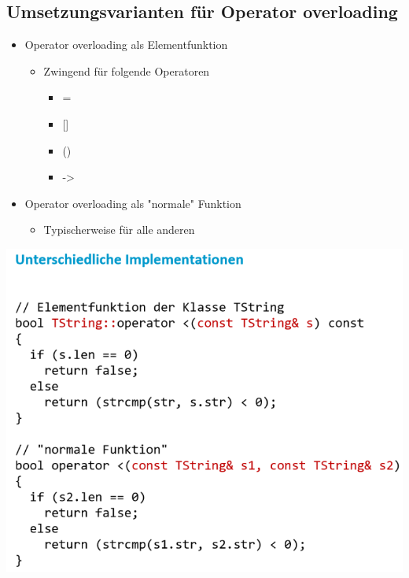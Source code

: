 \begin{multicols}{2}
\subsection{Umsetzungsvarianten für Operator overloading}
\begin{itemize}
	\item Operator overloading als Elementfunktion
	\begin{itemize}
		\item Zwingend für folgende Operatoren
		\begin{itemize}
			\item{} =
			\item {} []
			\item {} ()
			\item {} ->
		\end{itemize}
	\end{itemize}
	\item Operator overloading als "normale"  Funktion
	\begin{itemize}
		\item Typischerweise für alle anderen
	\end{itemize}
\end{itemize}
\vfill\null
\columnbreak
\includegraphics[width=0.8\linewidth]{images/operatorOverloadingBeide.png}
\end{multicols}

